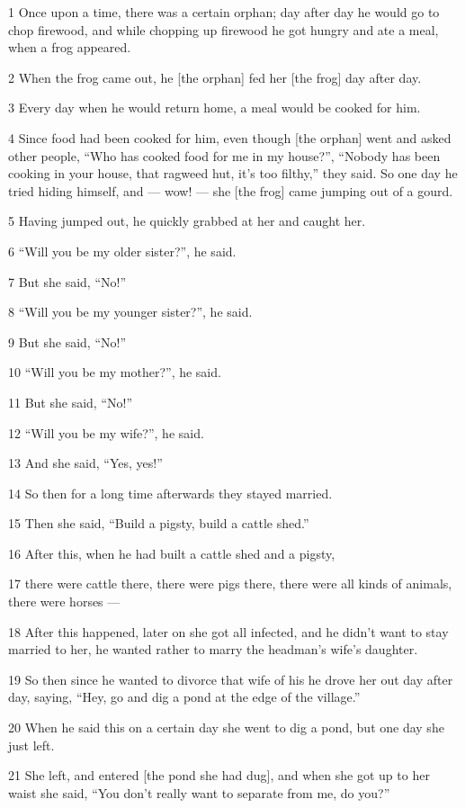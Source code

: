 
1 Once upon a time, there was a certain orphan; day after day he would go to chop
firewood, and while chopping up firewood he got hungry and ate a meal, when a frog
appeared.

2 When the frog came out, he [the orphan] fed her [the frog] day after day.

3 Every day when he would return home, a meal would be cooked for him.

4 Since food had been cooked for him, even though [the orphan] went and asked other
people, ``Who has cooked food for me in my house?'', ``Nobody has been cooking
in your house, that ragweed hut, it's too filthy,'' they said. So one day he tried
hiding himself, and --- wow! --- she [the frog] came jumping out of a gourd.

5 Having jumped out, he quickly grabbed at her and caught her.

6 ``Will you be my older sister?'', he said.

7 But she said, ``No!''

8 ``Will you be my younger sister?'', he said.

9 But she said, ``No!''

10 ``Will you be my mother?'', he said.

11 But she said, ``No!''

12 ``Will you be my wife?'', he said.

13 And she said, ``Yes, yes!''

14 So then for a long time afterwards they stayed married.

15 Then she said, ``Build a pigsty, build a cattle shed.''

16 After this, when he had built a cattle shed and a pigsty,

17 there were cattle there, there were pigs there, there were all kinds of animals,
there were horses ---

18 After this happened, later on she got all infected, and he didn't want to stay
married to her, he wanted rather to marry the headman's wife's daughter.

19 So then since he wanted to divorce that wife of his he drove her out day after
day, saying, ``Hey, go and dig a pond at the edge of the village.''

20 When he said this on a certain day she went to dig a pond, but one day she just
left.

21 She left, and entered [the pond she had dug], and when she got up to her waist
she said, ``You don't really want to separate from me, do you?''

